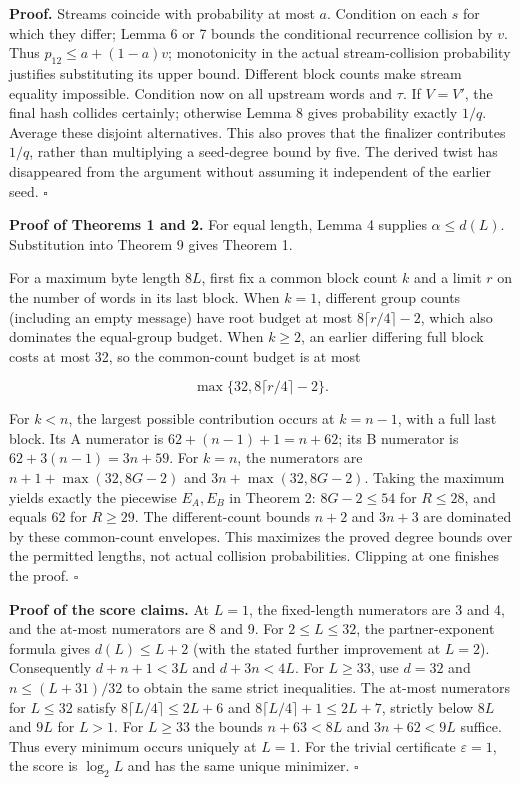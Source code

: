 \documentclass[
  11pt,
]{article}
\begin{document}
\textbf{Proof.} Streams coincide with probability at most \(a\).
Condition on each \(s\) for which they differ; Lemma 6 or 7 bounds the
conditional recurrence collision by \(v\). Thus \(p_{12}\le a+(1-a)v\);
monotonicity in the actual stream-collision probability justifies
substituting its upper bound. Different block counts make stream
equality impossible. Condition now on all upstream words and \(\tau\).
If \(V=V'\), the final hash collides certainly; otherwise Lemma 8 gives
probability exactly \(1/q\). Average these disjoint alternatives. This
also proves that the finalizer contributes \(1/q\), rather than
multiplying a seed-degree bound by five. The derived twist has
disappeared from the argument without assuming it independent of the
earlier seed. \(\square\)

\textbf{Proof of Theorems 1 and 2.} For equal length, Lemma 4 supplies
\(\alpha\le d(L)\). Substitution into Theorem 9 gives Theorem 1.

For a maximum byte length \(8L\), first fix a common block count \(k\)
and a limit \(r\) on the number of words in its last block. When
\(k=1\), different group counts (including an empty message) have root
budget at most \(8\lceil r/4\rceil-2\), which also dominates the
equal-group budget. When \(k\ge2\), an earlier differing full block
costs at most 32, so the common-count budget is at most

\[ \max\{32,8\lceil r/4\rceil-2\}. \]

For \(k<n\), the largest possible contribution occurs at \(k=n-1\), with
a full last block. Its A numerator is \(62+(n-1)+1=n+62\); its B
numerator is \(62+3(n-1)=3n+59\). For \(k=n\), the numerators are
\(n+1+\max(32,8G-2)\) and \(3n+\max(32,8G-2)\). Taking the maximum
yields exactly the piecewise \(E_A,E_B\) in Theorem 2: \(8G-2\le54\) for
\(R\le28\), and equals 62 for \(R\ge29\). The different-count bounds
\(n+2\) and \(3n+3\) are dominated by these common-count envelopes. This
maximizes the proved degree bounds over the permitted lengths, not
actual collision probabilities. Clipping at one finishes the proof.
\(\square\)

\textbf{Proof of the score claims.} At \(L=1\), the fixed-length
numerators are 3 and 4, and the at-most numerators are 8 and 9. For
\(2\le L\le32\), the partner-exponent formula gives \(d(L)\le L+2\)
(with the stated further improvement at \(L=2\)). Consequently
\(d+n+1<3L\) and \(d+3n<4L\). For \(L\ge33\), use \(d=32\) and
\(n\le(L+31)/32\) to obtain the same strict inequalities. The at-most
numerators for \(L\le32\) satisfy \(8\lceil L/4\rceil\le2L+6\) and
\(8\lceil L/4\rceil+1\le2L+7\), strictly below \(8L\) and \(9L\) for
\(L>1\). For \(L\ge33\) the bounds \(n+63<8L\) and \(3n+62<9L\) suffice.
Thus every minimum occurs uniquely at \(L=1\). For the trivial
certificate \(\varepsilon=1\), the score is \(\log_2L\) and has the same
unique minimizer. \(\square\)
\end{document}
